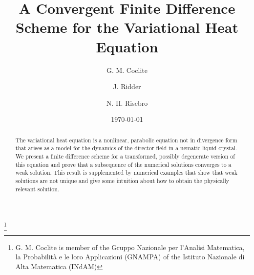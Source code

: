 \documentclass[11pt,leqno]{amsart}
\begin{document}
\title[A Convergent Scheme for the Variational Heat Equation]{A Convergent Finite Difference Scheme for the Variational Heat Equation}

\author{G. M. Coclite}
\address[Giuseppe Maria Coclite]{\newline
 Dipartimento di Matematica, \newline Universit\`a di Bari, \newline
 Via E.~Orabona 4,I--70125 Bari, Italy.}

\author[J. Ridder]{J. Ridder}
\address[Johanna Ridder]{\newline
    Department of Mathematics,
    \newline University of Oslo,
  \newline P.O.Box NO-1053, Blindern, Oslo-0316, Norway.} 
   
\author[N. H. Risebro]{N. H. Risebro}
\address[Nils Henrik Risebro]{\newline
    Department of Mathematics,
    \newline University of Oslo,
  \newline P.O.Box NO-1053, Blindern, Oslo-0316, Norway.} 

 \thanks{G. M. Coclite is member of the Gruppo Nazionale  per l'Analisi Matematica, 
  la Probabilit\`a e le  loro Applicazioni (GNAMPA) of the Istituto Nazionale di Alta Matematica (INdAM)}

\date{\today}

\maketitle

\begin{abstract}
The variational heat equation is a nonlinear, parabolic equation not in divergence form that arises as a model for the dynamics of the director field in a nematic liquid crystal. We present a finite difference scheme for a transformed, possibly degenerate version of this equation and prove that a subsequence of the numerical solutions converges to a weak solution. This result is supplemented by numerical examples that show that weak solutions are not unique and give some intuition about how to obtain the physically relevant solution.
\end{abstract}
\end{document}
